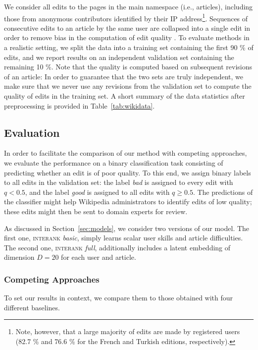 \documentclass[format=sigconf]{acmart}
\begin{document}
We consider all edits to the pages in the main namespace (i.e., articles), including those from anonymous contributors identified by their IP address\footnote{%
Note, however, that a large majority of edits are made by registered users (\num{82.7} \% and \num{76.6} \% for the French and Turkish editions, respectively).}.
Sequences of consecutive edits to an article by the same user are collapsed into a single edit in order to remove bias in the computation of edit quality \citep{adler2007content}.
To evaluate methods in a realistic setting, we split the data into a training set containing the first \num{90} \% of edits, and we report results on an independent validation set containing the remaining \num{10} \%.
Note that the quality is computed based on subsequent revisions of an article:
In order to guarantee that the two sets are truly independent, we make sure that we never use any revisions from the validation set to compute the quality of edits in the training set.
A short summary of the data statistics after preprocessing is provided in Table~\ref{tab:wikidata}.


\subsection{Evaluation}

In order to facilitate the comparison of our method with competing approaches, we evaluate the performance on a binary classification task consisting of predicting whether an edit is of poor quality.
To this end, we assign binary labels to all edits in the validation set: the label \emph{bad} is assigned to every edit with $q < 0.5$, and the label \emph{good} is assigned to all edits with $q \ge 0.5$.
The predictions of the classifier might help Wikipedia administrators to identify edits of low quality;
these edits might then be sent to domain experts for review.

As discussed in Section~\ref{sec:models}, we consider two versions of our model.
The first one, \textsc{interank} \emph{basic}, simply learns scalar user skills and article difficulties.
The second one, \textsc{interank} \emph{full}, additionally includes a latent embedding of dimension $D = 20$ for each user and article.

\subsubsection{Competing Approaches}
\label{sec:wikicompeting}
To set our results in context, we compare them to those obtained with four different baselines.
\end{document}
